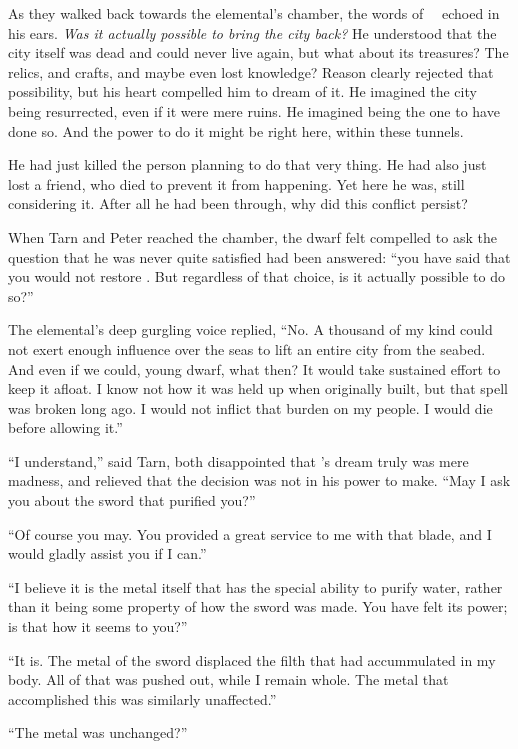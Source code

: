 As they walked back towards the elemental's chamber, the words of \mothzam\ \driktur\ echoed in his ears.  \emph{Was it actually possible to bring the city back?}  He understood that the city itself was dead and could never live again, but what about its treasures?  The relics, and crafts, and maybe even lost knowledge?  Reason clearly rejected that possibility, but his heart compelled him to dream of it.  He imagined the city being resurrected, even if it were mere ruins.  He imagined being the one to have done so.  And the power to do it might be right here, within these tunnels.

He had just killed the person planning to do that very thing.  He had also just lost a friend, who died to prevent it from happening.  Yet here he was, still considering it.  After all he had been through, why did this conflict persist?

When Tarn and Peter reached the chamber, the dwarf felt compelled to ask the question that he was never quite satisfied had been answered: ``you have said that you would not restore \valdunmir.  But regardless of that choice, is it actually possible to do so?''

The elemental's deep gurgling voice replied, ``No.  A thousand of my kind  could not exert enough influence over the seas to lift an entire city from the seabed.  And even if we could, young dwarf, what then?  It would take sustained effort to keep it afloat.  I know not how it was held up when originally built, but that spell was broken long ago.  I would not inflict that burden on my people.  I would die before allowing it.''

``I understand,'' said Tarn, both disappointed that \mothzam's dream truly was mere madness, and relieved that the decision was not in his power to make.  ``May I ask you about the sword that purified you?''

``Of course you may.  You provided a great service to me with that blade, and I would gladly assist you if I can.''

``I believe it is the metal itself that has the special ability to purify water, rather than it being some property of how the sword was made.  You have felt its power; is that how it seems to you?''

``It is.  The metal of the sword displaced the filth that had accummulated in my body.  All of that was pushed out, while I remain whole.  The metal that accomplished this was similarly unaffected.''

``The metal was unchanged?''

